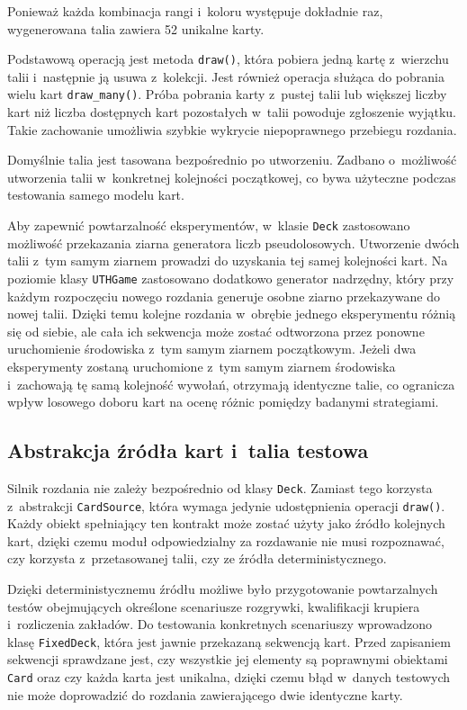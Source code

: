 Ponieważ każda kombinacja rangi i~koloru występuje dokładnie raz,
wygenerowana talia zawiera 52 unikalne karty.

Podstawową operacją jest metoda \texttt{draw()}, która pobiera jedną kartę
z~wierzchu talii i~następnie ją usuwa z~kolekcji. Jest również
operacja służąca do pobrania wielu kart \texttt{draw\_many()}. Próba pobrania karty z~pustej talii lub większej
liczby kart niż liczba dostępnych kart pozostałych w~talii powoduje zgłoszenie wyjątku.
Takie zachowanie umożliwia szybkie wykrycie niepoprawnego przebiegu rozdania.

Domyślnie talia jest tasowana bezpośrednio po utworzeniu. Zadbano o~możliwość
utworzenia talii w~konkretnej kolejności początkowej, co bywa użyteczne podczas testowania
samego modelu kart.

Aby zapewnić powtarzalność eksperymentów, w~klasie \texttt{Deck} zastosowano możliwość
przekazania ziarna generatora liczb pseudolosowych. Utworzenie dwóch talii z~tym samym
ziarnem prowadzi do uzyskania tej samej kolejności kart. Na poziomie klasy \texttt{UTHGame}
zastosowano dodatkowo generator nadrzędny, który przy każdym rozpoczęciu nowego rozdania
generuje osobne ziarno przekazywane do nowej talii. Dzięki temu kolejne rozdania w~obrębie
jednego eksperymentu różnią się od siebie, ale cała ich sekwencja może zostać odtworzona przez
ponowne uruchomienie środowiska z~tym samym ziarnem początkowym. Jeżeli dwa eksperymenty
zostaną uruchomione z~tym samym ziarnem środowiska i~zachowają tę samą kolejność wywołań,
otrzymają identyczne talie, co ogranicza wpływ losowego doboru kart na ocenę różnic
pomiędzy badanymi strategiami.

\subsection{Abstrakcja źródła kart i~talia testowa}
\label{subsec:zrodlo-kart}

Silnik rozdania nie zależy bezpośrednio od klasy \texttt{Deck}. Zamiast tego
korzysta z~abstrakcji \texttt{CardSource}, która wymaga jedynie udostępnienia
operacji \texttt{draw()}. Każdy obiekt spełniający ten kontrakt może zostać
użyty jako źródło kolejnych kart, dzięki czemu moduł odpowiedzialny za
rozdawanie nie musi rozpoznawać, czy korzysta z~przetasowanej talii, czy
ze źródła deterministycznego.

Dzięki deterministycznemu źródłu możliwe było przygotowanie powtarzalnych testów obejmujących
określone scenariusze rozgrywki, kwalifikacji krupiera i~rozliczenia
zakładów. Do testowania konkretnych scenariuszy wprowadzono klasę \texttt{FixedDeck},
która jest jawnie przekazaną sekwencją kart.
Przed zapisaniem sekwencji sprawdzane jest, czy wszystkie
jej elementy są poprawnymi obiektami \texttt{Card} oraz czy każda karta jest unikalna,
dzięki czemu błąd w~danych testowych nie może
doprowadzić do rozdania zawierającego dwie identyczne karty.

